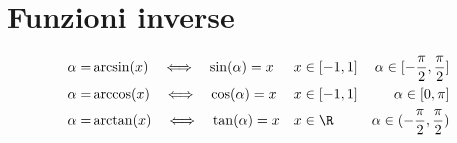 \section{Funzioni inverse}
\begin{align}
\alpha=&\arcsin(x)\quad\Longleftrightarrow\quad\sin(\alpha)=x&& x\in[-1,1]&\alpha\in[-\dfrac{\pi}{2},\dfrac{\pi}{2}]\\
\alpha=&\arccos(x)\quad\Longleftrightarrow\quad\cos(\alpha)=x&&x\in[-1,1]&\alpha\in[0,\pi]\\
\alpha=&\arctan(x)\quad\Longleftrightarrow\quad\tan(\alpha)=x&& x\in\R
&\alpha\in(-\dfrac{\pi}{2},\dfrac{\pi}{2})
\end{align}		
